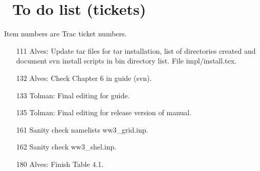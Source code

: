 \pagestyle{myheadings} \setcounter{page}{1} \setcounter{footnote}{0}

\section{~To do list (tickets)} \label{app:to_do}
\newcounters 
\vssub

\noindent
Item numbers are Trac ticket numbers.

\begin{itemize}

\item [111] Alves: Update tar files for tar installation, list of directories
  created and document svn install scripts in bin directory list. File
  impl/install.tex. 

\item [132] Alves: Check Chapter 6 in guide (svn).

\item [133] Tolman: Final editing for guide. 

\item [135] Tolman: Final editing for release version of manual.

\item [161] Sanity check namelists {\file ww3\_grid.inp}.

\item [162] Sanity check {\file ww3\_shel.inp}.

\item [180] Alves: Finish Table 4.1.

\end{itemize}

\bpage
\pagestyle{empty}
